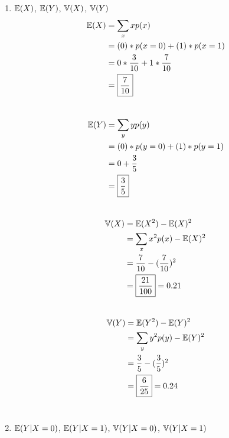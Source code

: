 \documentclass[12pt, fullpage,letterpaper]{article}
\begin{document}
\begin{enumerate}
\begin{enumerate}
\begin{enumerate}
            \item $\mathbb{E}(X)$, $\mathbb{E}(Y)$, $\mathbb{V}(X)$, $\mathbb{V}(Y)$
            \\
            \[
            	\begin{split}
            		\mathbb{E}(X) &= \sum_x x p(x)
            			\\
            			&= (0) * p(x=0) + (1) * p(x=1)
            			\\
            			&= 0 * \frac{3}{10} + 1 * \frac{7}{10}
            			\\
            			&= \boxed{\frac{7}{10}}
            			\\
            	\end{split}
            \]
            \\
            \[
            	\begin{split}
            		\mathbb{E}(Y) &= \sum_y y p(y)
            			\\
            			&= (0) * p(y=0) + (1) * p(y=1)
            			\\
            			&= 0  +  \frac{3}{5}
            			\\
            			&= \boxed{\frac{3}{5}}
            			\\
            	\end{split}
            \]
            \\
            \[
            	\begin{split}
            		\mathbb{V}(X) &= \mathbb{E}(X^2) - \mathbb{E}(X)^2
            			\\
            			&= \sum_x x^2 p(x) - \mathbb{E}(X)^2
            			\\
            			&= \frac{7}{10} - (\frac{7}{10})^2
            			\\
            			&= \boxed{\frac{21}{100}} = 0.21
            			\\
            	\end{split}
            \]
            \\
          
            \[
            	\begin{split}
            		\mathbb{V}(Y) &= \mathbb{E}(Y^2) - \mathbb{E}(Y)^2
            			\\
            			&= \sum_y y^2 p(y) - \mathbb{E}(Y)^2
            			\\
            			&= \frac{3}{5} - (\frac{3}{5})^2
            			\\
            			&= \boxed{\frac{6}{25}} = 0.24
            			\\
            	\end{split}
            \]
            \\
            \item  $\mathbb{E}(Y|X=0)$, $\mathbb{E}(Y|X=1)$,  $\mathbb{V}(Y|X=0)$, $\mathbb{V}(Y|X=1)$ 
            

\end{enumerate}
\end{enumerate}
\end{enumerate}
\end{document}
